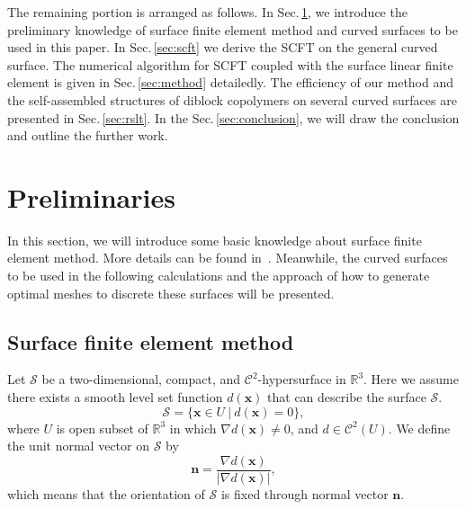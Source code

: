 \documentclass[final,1p,times]{elsarticle}
\newcommand{\bx}{\mathbf{x}}
\newcommand{\calS}{\mathcal{S}}
\begin{document}
The remaining portion is arranged as follows. In Sec.\,\ref{sec:pre}, we
introduce the preliminary knowledge of surface finite element method and
curved surfaces to be used in this paper.  In Sec.\,\ref{sec:scft} we derive the
SCFT on the general curved surface. The numerical algorithm for SCFT coupled
with the surface linear finite element is given in Sec.\,\ref{sec:method}
detailedly.  The efficiency of our method and the self-assembled structures of
diblock copolymers on several curved surfaces are presented in
Sec.\,\ref{sec:rslt}. In the Sec.\,\ref{sec:conclusion}, we will draw the
conclusion and outline the further work.

\section{Preliminaries}\label{sec:pre}

In this section, we will introduce some basic knowledge about
surface finite element method. More details can be found in
\,\cite{Dziuk;Elliott2013}. Meanwhile, the curved surfaces to be used 
in the following calculations and the approach of how to generate
optimal meshes to discrete these surfaces will be presented.

\subsection{Surface finite element method}

Let $\calS$ be a two-dimensional, compact, and $\mathcal C^2$-hypersurface in $\mathbb
R^3$.  Here we assume there exists a smooth level set function $d(\bx)$
that can describe the surface $\calS$. 
\begin{equation*}
    \calS = \{\bx\in U ~|~ d(\bx) = 0\},
\end{equation*}
where $U$ is open subset of $\mathbb R^3$ in which $\nabla d(\bx) \not=0$, and
$d\in \mathcal C^2(U)$. We define the unit normal vector on
$\calS$ by 
\begin{equation*}
    \boldsymbol n = \frac{\nabla d(\bx)}{|\nabla d(\bx)|},
\end{equation*}
which means that the orientation of $\calS$ is fixed through normal
vector $\boldsymbol n$.
\end{document}
